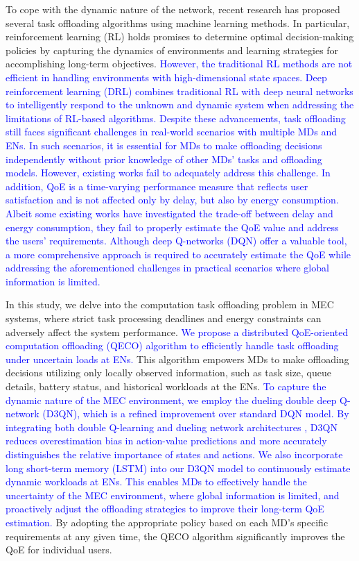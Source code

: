 \documentclass[12pt,draftclsnofoot,onecolumn]{IEEEtran}
\begin{document}
To cope with the dynamic nature of the network, recent research has proposed several task offloading algorithms using machine learning methods. In particular, reinforcement learning (RL) \cite{mnih2015human} holds promises to determine optimal decision-making policies by capturing the dynamics of environments and learning strategies for accomplishing long-term objectives. \textcolor{blue}{However, the traditional RL methods are not efficient in handling environments with high-dimensional state  spaces. Deep reinforcement learning (DRL) combines  traditional RL  with  deep  neural  networks  to  intelligently respond to the unknown and dynamic system when addressing the limitations of RL-based algorithms. Despite these advancements, task offloading still faces significant challenges in real-world scenarios with multiple MDs and ENs. In such scenarios, it is essential for MDs to make offloading decisions independently  without prior knowledge of other MDs’ tasks and offloading models. However, existing works fail to adequately address this challenge. In addition, QoE is a time-varying performance measure that reflects user satisfaction and is not affected only by delay, but also by energy consumption. Albeit some existing works have investigated the trade-off between delay and energy consumption, they fail to properly estimate the QoE value and address the users' requirements. Although deep Q-networks (DQN) offer a valuable tool, a more comprehensive approach is required to accurately estimate the QoE while addressing the aforementioned challenges in practical scenarios where global information is limited.}


In this study, we delve into the computation task offloading problem in MEC systems, where strict task processing deadlines and energy constraints can adversely affect the system performance.   \textcolor{blue}{We propose a distributed QoE-oriented computation offloading (QECO) algorithm to efficiently handle task offloading under uncertain loads at ENs.} This algorithm empowers MDs to make offloading decisions utilizing only locally observed information, such as task size, queue details, battery status, and historical workloads at the ENs. 
\textcolor{blue}{To capture the dynamic nature of the MEC environment, we employ the dueling double deep Q-network (D3QN), which is a refined improvement over standard DQN model. By integrating both double Q-learning \cite{van2016deep} and dueling network architectures \cite{wang2016dueling}, D3QN reduces overestimation bias in action-value predictions and more accurately distinguishes the relative importance of states and actions. We also incorporate long short-term memory (LSTM) \cite{hochreiter1997long} into our D3QN model to continuously estimate dynamic workloads at ENs. This enables MDs to effectively handle the uncertainty of the MEC environment, where global information is limited, and proactively adjust the offloading strategies to improve their long-term QoE estimation.} By adopting the appropriate policy based on each MD’s specific requirements at any given time, the QECO algorithm significantly improves the QoE for individual users. 
\end{document}
